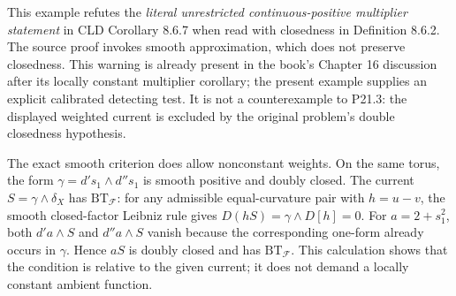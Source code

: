 \documentclass[11pt]{article}
\newcommand{\dp}{d'}
\newcommand{\ddp}{d''}
\newcommand{\BT}{\mathrm{BT}}
\begin{document}
This example refutes the \emph{literal unrestricted continuous-positive
multiplier statement} in CLD Corollary 8.6.7 when read with closedness in
Definition 8.6.2. The source proof invokes smooth approximation, which
does not preserve closedness. This warning is already present in the
book's Chapter 16 discussion after its locally constant multiplier
corollary; the present example supplies an explicit calibrated detecting
test. It is not a counterexample to P21.3: the displayed weighted current
is excluded by the original problem's double closedness hypothesis.

The exact smooth criterion does allow nonconstant weights. On the same
torus, the form $\gamma=\dp s_1\wedge\ddp s_1$ is smooth positive and
doubly closed. The current $S=\gamma\wedge\delta_X$ has
$\BT_{\mathcal F}$: for any admissible equal-curvature pair with
$h=u-v$, the smooth closed-factor Leibniz rule gives
$D(hS)=\gamma\wedge D[h]=0$. For $a=2+s_1^2$, both
$\dp a\wedge S$ and $\ddp a\wedge S$ vanish because the corresponding
one-form already occurs in $\gamma$. Hence $aS$ is doubly closed and
has $\BT_{\mathcal F}$. This calculation shows that the condition is
relative to the given current; it does not demand a locally constant
ambient function.
\end{document}
